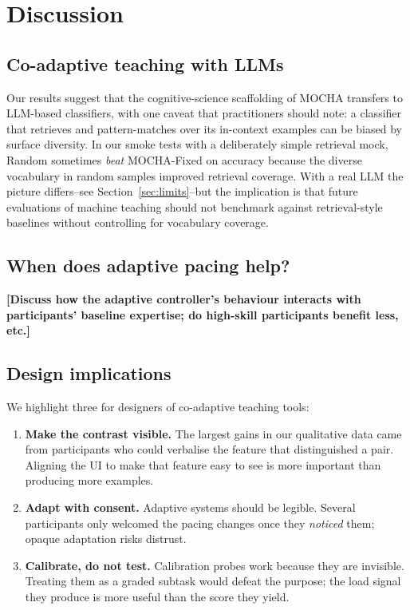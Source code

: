 \documentclass[sigchi, anonymous=true, review=true]{acmart}
\newcommand{\chiplaceholder}[1]{{\color{red}\textbf{[#1]}}}
\begin{document}
\section{Discussion}

\subsection{Co-adaptive teaching with LLMs}

Our results suggest that the cognitive-science scaffolding of MOCHA transfers
to LLM-based classifiers, with one caveat that practitioners should note: a
classifier that retrieves and pattern-matches over its in-context examples
can be biased by surface diversity. In our smoke tests with a deliberately
simple retrieval mock, Random sometimes \emph{beat} MOCHA-Fixed on accuracy
because the diverse vocabulary in random samples improved retrieval
coverage. With a real LLM the picture differs--see
Section~\ref{sec:limits}--but the implication is that future evaluations of
machine teaching should not benchmark against retrieval-style baselines
without controlling for vocabulary coverage.

\subsection{When does adaptive pacing help?}

\chiplaceholder{Discuss how the adaptive controller's behaviour interacts
with participants' baseline expertise; do high-skill participants benefit
less, etc.}

\subsection{Design implications}

We highlight three for designers of co-adaptive teaching tools:

\begin{enumerate}
  \item \textbf{Make the contrast visible.} The largest gains in our
    qualitative data came from participants who could verbalise the feature
    that distinguished a pair. Aligning the UI to make that feature easy to
    see is more important than producing more examples.
  \item \textbf{Adapt with consent.} Adaptive systems should be legible.
    Several participants only welcomed the pacing changes once they
    \emph{noticed} them; opaque adaptation risks distrust.
  \item \textbf{Calibrate, do not test.} Calibration probes work because they
    are invisible. Treating them as a graded subtask would defeat the
    purpose; the load signal they produce is more useful than the score they
    yield.
\end{enumerate}
\end{document}
